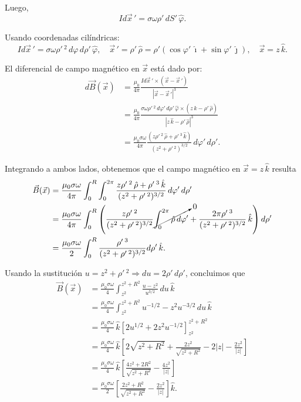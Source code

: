\begin{ejemplo}
Luego,
$$I d\vec{x}\,' = \sigma \omega \rho' \,dS'\, \hat{\varphi}.$$

Usando coordenadas cilíndricas:
$$I d\vec{x}\,' = \sigma \omega \rho'\,^2 \,d\varphi \,d\rho'\, \hat{\varphi}, \quad  \vec{x}\,' = \rho' \,\hat{\rho} = \rho' (\cos \varphi' \, \hat{\imath} + \sin \varphi' \,\hat{\jmath}), \quad \vec{x} = z \,\hat{k}.$$

El diferencial de campo magnético en $\Vec{x}$ está dado por:
\begin{align*}
d\vec{B}(\vec{x}) &= \frac{\mu_0}{4\pi}  \frac{I d\vec{x}\,' \times (\vec{x} - \vec{x}\,')}{|\vec{x} - \vec{x}\,'|^3} \\
&=  \frac{\mu_0}{4\pi} \frac{\sigma \omega \rho'\,^2\, d\varphi' \,d\rho'\, \hat{\varphi} \times (z \,\hat{k} - \rho'\, \hat{\rho})}{|z \,\hat{k} - \rho'\, \hat{\rho}|^3} \\
&= \frac{\mu_0 \sigma \omega}{4\pi} \frac{(z \rho'\,^2 \,\hat{\rho} + \rho'\,^3 \,\hat{k})}{(z^2 + \rho'\,^2)^{3/2}} \,d\varphi'\, d\rho'.    
\end{align*}

Integrando a ambos lados, obtenemos que el campo magnético en $\Vec{x} = z\,\hat{k}$ resulta
\begin{align*}
  \vec{B}(\vec{x}) &= \frac{\mu_0 \sigma \omega}{4\pi} \int_0^R \int_0^{2\pi} \frac{z \rho'\,^2\, \hat{\rho} + \rho'\,^3 \,\hat{k}}{(z^2 + \rho'\,^2)^{3/2}} \,d\varphi'\, d\rho' \\
&= \frac{\mu_0 \sigma \omega}{4\pi} \int_0^R \left( \frac{z \rho'\,^2}{(z^2 + \rho'\,^2)^{3/2}} \cancelto{0}{\int_0^{2\pi} \hat{\rho} \,d\varphi' }   + \frac{2\pi \rho'\,^3}{(z^2+\rho'\,^2)^{3/2}} \,\hat{k} \right)  d\rho' \\
&= \frac{\mu_0 \sigma \omega}{2} \int_0^R \frac{\rho'\,^3}{(z^2 + \rho'\,^2)^{3/2}} d\rho'\, \hat{k}.  
\end{align*}

Usando la sustitución $u = z^2 + \rho'\,^2 \Rightarrow du = 2\rho'\, d\rho'$, concluimos que
\begin{align*}
 \vec{B}(\vec{x}) &= \frac{\mu_0 \sigma \omega}{4} \int_{z^2}^{z^2 + R^2} \frac{u-z^2}{u^{3/2}} \,du \,\hat{k} \\
&= \frac{\mu_0 \sigma \omega}{4} \int_{z^2}^{z^2 + R^2} u^{- 1/2} - z^2 u^{-3/2} \,du \,\hat{k} \\
&= \frac{\mu_0 \sigma \omega}{4} \,\hat{k} \left[ 2 u^{1/2} + 2z^2 u^{-1/2} \right]_{z^2}^{z^2 + R^2} \\
&= \frac{\mu_0 \sigma \omega}{4}\, \hat{k} \left[ 2 \sqrt{z^2 + R^2} + \frac{2z^2}{\sqrt{z^2+R^2}} - 2 |z| - \frac{2z^2}{|z|} \right] \\
&= \frac{\mu_0 \sigma \omega}{4} \,\hat{k} \left[ \frac{4z^2 + 2R^2}{\sqrt{z^2+R^2}} -  \frac{4z^2}{|z|} \right] \\
&= \frac{\mu_0 \sigma \omega}{2} \left[ \frac{2z^2 + R^2}{\sqrt{z^2+R^2}} -  \frac{2z^2}{|z|} \right] \hat{k}.   
\end{align*}

\end{ejemplo}

